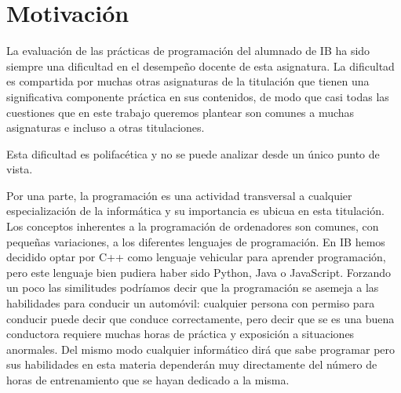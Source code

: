 \documentclass[twocolumn,twoside,a4paper, 10pt]{article}
\begin{document}

\section{Motivación}
La evaluación de las prácticas de programación del alumnado de IB ha sido siempre una dificultad en el
desempeño docente de esta asignatura. 
La dificultad es compartida por muchas otras asignaturas de la titulación que tienen una significativa
componente práctica en sus contenidos, de modo que casi todas las cuestiones que en este trabajo queremos
plantear son comunes a muchas asignaturas e incluso a otras titulaciones.

Esta dificultad es polifacética y no se puede analizar desde un único punto de vista.

Por una parte, la programación es una actividad transversal a cualquier especialización de la informática y su
importancia es ubicua en esta titulación.
Los conceptos inherentes a la programación de ordenadores son comunes, con pequeñas variaciones, a los
diferentes lenguajes de programación.
En IB hemos decidido optar por C++ como lenguaje vehicular para aprender programación, pero este lenguaje bien
pudiera haber sido Python, Java o JavaScript.
Forzando un poco las similitudes podríamos decir que la programación se asemeja a las habilidades para
conducir un automóvil: cualquier persona con permiso para conducir puede decir que conduce correctamente, pero
decir que se es una buena conductora requiere muchas horas de práctica y exposición a situaciones anormales.
Del mismo modo cualquier informático dirá que sabe programar pero sus habilidades en esta materia dependerán
muy directamente del número de horas de entrenamiento que se hayan dedicado a la misma.
\end{document}
